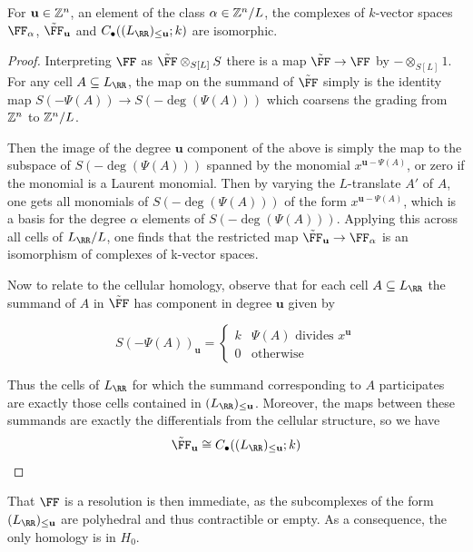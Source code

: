 \documentclass{amsart}
\begin{document}
\begin{prop}
  \label{prop:hhlStrands}
  For $\mathbf{u}\in \mathbb Z^n$, an element of the class $\alpha\in \mathbb Z^n/L$, the complexes of $k$-vector spaces $\FF_{\alpha}$, $\tilde \FF_{\mathbf{u}}$ and $C_\bullet((L_{\RR})_{\leq \mathbf{u}};k)$ are isomorphic.
\end{prop}
\begin{proof}
  Interpreting $\FF$ as $\tilde \FF \otimes_{S[L]}S$ there is a map $\tilde \FF \rightarrow \FF$ by $-\otimes_{S[L]}1$. For any cell $A\subseteq L_{\RR}$, the map on the summand of $\tilde \FF$ simply is the identity map $S(-\Psi(A))\rightarrow S(-\deg(\Psi(A)))$ which coarsens the grading from $\mathbb Z^n$ to $\mathbb Z^n/L$.

  Then the image of the degree $\mathbf{u}$ component of the above is simply the map to the subspace of $S(-\deg(\Psi(A)))$ spanned by the monomial $x^{\mathbf{u}-\Psi(A)}$, or zero if the monomial is a Laurent monomial.
  Then by varying the $L$-translate $A'$ of $A$, one gets all monomials of $S(-\deg(\Psi(A)))$ of the form $x^{\mathbf{u}-\Psi(A)}$, which is a basis for the degree $\alpha$ elements of $S(-\deg(\Psi(A)))$. Applying this across all cells of $L_{\RR}/L$, one finds that the restricted map $\tilde \FF_{\mathbf{u}}\rightarrow \FF_{\alpha}$ is an isomorphism of complexes of k-vector spaces.
  
  Now to relate to the cellular homology, observe that for each cell $A\subseteq L_{\RR}$ the summand of $A$ in $\tilde \FF$ has component in degree $\mathbf{u}$ given by

  \[S(-\Psi(A))_{\mathbf{u}} =
  \begin{cases}
    k & \Psi(A)\text{ divides } x^{\mathbf{u}}\\
    0 & \text{otherwise}
  \end{cases}\]

  Thus the cells of $L_{\RR}$ for which the summand corresponding to $A$ participates are exactly those cells contained in $(L_{\RR})_{\leq \mathbf{u}}$. Moreover, the maps between these summands are exactly the differentials from the cellular structure, so we have
  \[\tilde \FF_{\mathbf{u}} \cong C_\bullet((L_{\RR})_{\leq \mathbf{u}};k)\]
\end{proof}

That $\FF$ is a resolution is then immediate, as the subcomplexes of the form $(L_{\RR})_{\leq \mathbf{u}}$ are polyhedral and thus contractible or empty. As a consequence, the only homology is in $H_0$.
\end{document}
